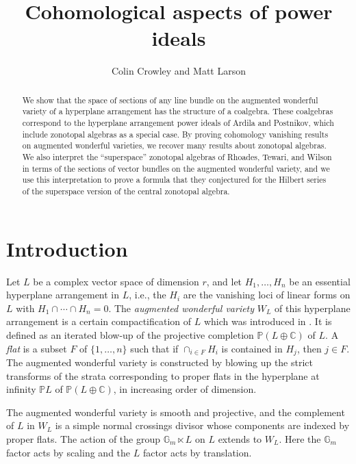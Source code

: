\documentclass{amsart}
\theoremstyle{definition}
\begin{document}
\title{Cohomological aspects of power ideals}          
    
\author{Colin Crowley and Matt Larson}
\begin{abstract}
We show that the space of sections of any line bundle on the augmented wonderful variety of a hyperplane arrangement has the structure of a coalgebra. These coalgebras correspond to the hyperplane arrangement power ideals of Ardila and Postnikov, which include zonotopal algebras as a special case. By proving cohomology vanishing results on augmented wonderful varieties, we recover many results about zonotopal algebras. We also interpret the ``superspace'' zonotopal algebras of Rhoades, Tewari, and Wilson in terms of the sections of vector bundles on the augmented wonderful variety, and we use this interpretation to prove a formula that they conjectured for the Hilbert series of the superspace version of the central zonotopal algebra. 
\end{abstract}
 
\maketitle

\vspace{-20 pt}

\section{Introduction}

Let $L$ be a complex vector space of dimension $r$, and let $H_1, \dotsc, H_n$ be an essential hyperplane arrangement in $L$, i.e., the $H_i$ are the vanishing loci of linear forms on $L$ with $H_1 \cap \dotsb \cap H_n = 0$. The \emph{augmented wonderful variety} $W_L$ of this hyperplane arrangement is a certain compactification of $L$ which was introduced in \cite{BHMPW20a}. It is defined as an iterated blow-up of the projective completion $\mathbb{P}(L \oplus \mathbb{C})$ of $L$. A \emph{flat} is a subset $F$ of $\{1, \dotsc, n\}$ such that if $\cap_{i \in F} H_i$ is contained in $H_j$, then $j \in F$. The augmented wonderful variety is constructed by blowing up  the strict transforms of the strata corresponding to proper flats in the hyperplane at infinity $\mathbb{P}L$ of $\mathbb{P}(L \oplus \mathbb{C})$, in increasing order of dimension. 

The augmented wonderful variety is smooth and projective, and the complement of $L$ in $W_L$ is a simple normal crossings divisor whose components are indexed by proper flats. 
The action of the group $\mathbb{G}_m \ltimes L$ on $L$ extends to $W_L$. Here the $\mathbb{G}_m$ factor acts by scaling and the $L$ factor acts by translation. 
\end{document}
